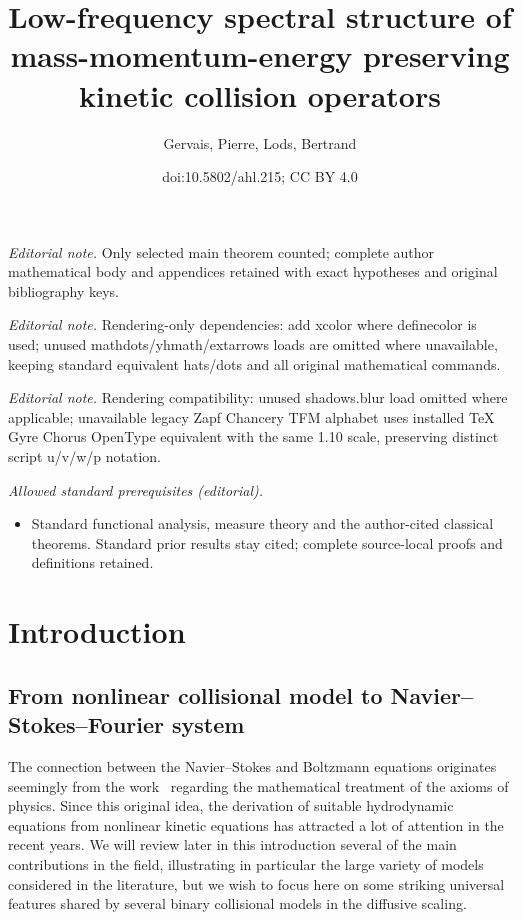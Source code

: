 \documentclass[10pt]{amsart}
\title{Low-frequency spectral structure of mass-momentum-energy preserving kinetic collision operators}
\author{Gervais, Pierre, Lods, Bertrand}
\date{doi:10.5802/ahl.215; CC BY 4.0}
\theoremstyle{definition}\newtheorem{defi}[theo]{Definition}\newtheorem{rema}[theo]{Remark}\newtheorem{exam}[theo]{Example}\newtheorem{exem}[theo]{Example}\newtheorem{nota}[theo]{Notation}
\begin{document}
\maketitle
\noindent\textit{Editorial note.} Only selected main theorem counted; complete author mathematical body and appendices retained with exact hypotheses and original bibliography keys.\par\medskip
\noindent\textit{Editorial note.} Rendering-only dependencies: add xcolor where definecolor is used; unused mathdots/yhmath/extarrows loads are omitted where unavailable, keeping standard equivalent hats/dots and all original mathematical commands.\par\medskip
\noindent\textit{Editorial note.} Rendering compatibility: unused shadows.blur load omitted where applicable; unavailable legacy Zapf Chancery TFM alphabet uses installed TeX Gyre Chorus OpenType equivalent with the same 1.10 scale, preserving distinct script u/v/w/p notation.\par\medskip
\noindent\textit{Allowed standard prerequisites (editorial).}\begin{itemize}
\item Standard functional analysis, measure theory and the author-cited classical theorems. Standard prior results stay cited; complete source-local proofs and definitions retained.
\end{itemize}\medskip
\break
\section{Introduction}



\subsection{From nonlinear collisional model to Navier--Stokes--Fourier system}

The connection between the Navier--Stokes and Boltzmann equations originates seemingly from the work~\cite{H1912} regarding the mathematical treatment of the axioms of physics. Since this original idea, the derivation of suitable hydrodynamic equations from nonlinear kinetic equations has attracted a lot of attention in the recent years. We will review later in this introduction several of the main contributions in the field, illustrating in particular the large variety of models considered in the literature, but we wish to focus here on some striking universal features shared by several binary collisional models in the diffusive scaling.
\end{document}
